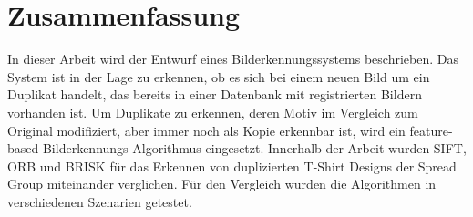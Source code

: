 
\chapter*{Zusammenfassung}
\label{sec:Zusammenfassung}
In dieser Arbeit wird der Entwurf eines Bilderkennungssystems beschrieben. 
Das System ist in der Lage  zu erkennen, ob es sich bei einem neuen Bild um ein Duplikat handelt, das bereits in einer Datenbank mit registrierten Bildern vorhanden ist.
Um Duplikate zu erkennen, deren Motiv im Vergleich zum Original modifiziert, aber immer noch als Kopie erkennbar ist, wird ein feature-based Bilderkennungs-Algorithmus eingesetzt. 
Innerhalb der Arbeit wurden SIFT, ORB und BRISK für das Erkennen von duplizierten T-Shirt Designs der Spread Group miteinander verglichen.
Für den Vergleich wurden die Algorithmen in verschiedenen Szenarien getestet.

